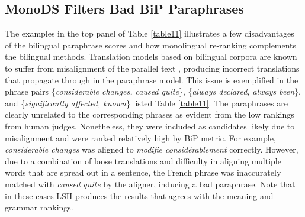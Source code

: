\documentclass[11pt]{article}
\newcommand{\mnote}[1]{\marginpar{\raggedleft\footnotesize\itshape#1}}
\begin{document}
\subsection{MonoDS Filters Bad BiP Paraphrases}
The examples in the top panel of Table \ref{table11} illustrates a few disadvantages of the bilingual paraphrase scores and how monolingual re-ranking complements the bilingual methods. Translation models based on bilingual corpora are known to suffer from misalignment of the parallel text \cite{BannardCallisonBurch05}, producing incorrect translations that propagate through in the paraphrase model. This issue is exemplified in the phrase pairs \{\emph{considerable changes, caused quite}\}, \{\emph{always declared, always been}\}, and \{\emph{significantly affected, known}\} listed Table \ref{table11}. The paraphrases are clearly unrelated to the corresponding phrases as evident from the low rankings from human judges. Nonetheless, they were included as candidates likely due to misalignment and were ranked relatively high by BiP metric. For example, \emph{considerable changes} was aligned to \emph{modifie consid{\'e}rablement} correctly. However, due to a combination of loose translations and difficulty in aligning multiple words that are spread out in a sentence, the French phrase was inaccurately matched with \emph{caused quite} by the aligner, inducing a bad paraphrase. Note that in these cases LSH produces the results that agrees with the meaning and grammar rankings.


%
%
\end{document}
